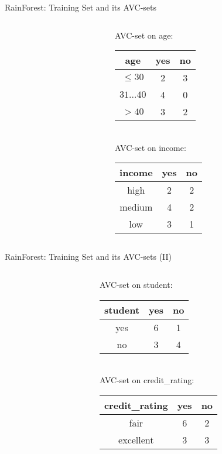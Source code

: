 \begin{frame}{RainForest: Training Set and its AVC-sets}
	\begin{columns}
		\begin{column}{0.6\textwidth}
			\small
			
		\end{column}
		\begin{column}{0.3\textwidth}
			\vspace{-3cm}

			\centering
			AVC-set on age:\\
			\begin{tabular}{|c|c|c|}
				\hline
				age          & yes & no \\\hline
				$\leq 30$    & 2   & 3  \\\hline
				$31\ldots40$ & 4   & 0  \\\hline
				$>40$        & 3   & 2  \\\hline
			\end{tabular}\\[1cm]
			AVC-set on income:\\
			\begin{tabular}{|c|c|c|}
				\hline
				income & yes & no \\\hline
				high   & 2   & 2  \\\hline
				medium & 4   & 2  \\\hline
				low    & 3   & 1  \\\hline
			\end{tabular}
		\end{column}
	\end{columns}
\end{frame}

\begin{frame}{RainForest: Training Set and its AVC-sets (II)}
	\begin{columns}
		\begin{column}{0.6\textwidth}
			\small
			
		\end{column}
		\begin{column}{0.3\textwidth}
			\vspace{-3cm}

			\centering
			AVC-set on student:\\
			\begin{tabular}{|c|c|c|}
				\hline
				student & yes & no \\\hline
				yes     & 6   & 1  \\\hline
				no      & 3   & 4  \\\hline
			\end{tabular}\\[1cm]
			AVC-set on credit\_rating:\\
			\begin{tabular}{|c|c|c|}
				\hline
				credit\_rating & yes & no \\\hline
				fair           & 6   & 2  \\\hline
				excellent      & 3   & 3  \\\hline
			\end{tabular}
		\end{column}
	\end{columns}
\end{frame}

